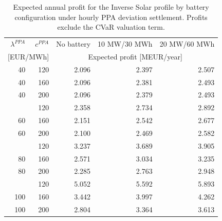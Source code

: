 \begin{table}[htbp]
\centering
\small
\caption{Expected annual profit for the Inverse Solar profile by battery configuration under hourly PPA deviation settlement. Profits exclude the CVaR valuation term.}
\label{tab:battery_expected_profit_inverse_solar}
\begin{tabular*}{\textwidth}{@{\extracolsep{\fill}}rrrrr@{}}
\toprule
$\lambda^{PPA}$ & $c^{PPA}$ & No battery & 10 MW/30 MWh & 20 MW/60 MWh \\
\multicolumn{2}{c}{[EUR/MWh]} & \multicolumn{3}{c}{Expected profit [MEUR/year]} \\
\midrule
40 & 120 & 2.096 & 2.397 & 2.507 \\
40 & 160 & 2.096 & 2.381 & 2.493 \\
40 & 200 & 2.096 & 2.379 & 2.493 \\
\addlinespace
60 & 120 & 2.358 & 2.734 & 2.892 \\
60 & 160 & 2.151 & 2.542 & 2.677 \\
60 & 200 & 2.100 & 2.469 & 2.582 \\
\addlinespace
80 & 120 & 3.237 & 3.689 & 3.905 \\
80 & 160 & 2.571 & 3.034 & 3.235 \\
80 & 200 & 2.285 & 2.763 & 2.948 \\
\addlinespace
100 & 120 & 5.052 & 5.592 & 5.893 \\
100 & 160 & 3.442 & 3.997 & 4.262 \\
100 & 200 & 2.804 & 3.364 & 3.613 \\
\bottomrule
\end{tabular*}
\end{table}
